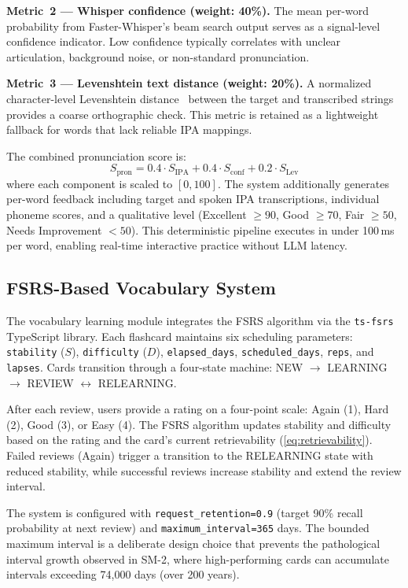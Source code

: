 \documentclass{IEEEtran}
\begin{document}
\textbf{Metric~2 --- Whisper confidence (weight: 40\%).} The mean per-word probability from Faster-Whisper's beam search output serves as a signal-level confidence indicator. Low confidence typically correlates with unclear articulation, background noise, or non-standard pronunciation.

\textbf{Metric~3 --- Levenshtein text distance (weight: 20\%).} A normalized character-level Levenshtein distance~\cite{levenshtein} between the target and transcribed strings provides a coarse orthographic check. This metric is retained as a lightweight fallback for words that lack reliable IPA mappings.

The combined pronunciation score is:
\begin{equation}
S_{\text{pron}} = 0.4 \cdot S_{\text{IPA}} + 0.4 \cdot S_{\text{conf}} + 0.2 \cdot S_{\text{Lev}}
\label{eq:pron_combined}
\end{equation}
where each component is scaled to $[0, 100]$. The system additionally generates per-word feedback including target and spoken IPA transcriptions, individual phoneme scores, and a qualitative level (Excellent $\geq 90$, Good $\geq 70$, Fair $\geq 50$, Needs Improvement $< 50$). This deterministic pipeline executes in under 100\,ms per word, enabling real-time interactive practice without LLM latency.

\subsection{FSRS-Based Vocabulary System}

The vocabulary learning module integrates the FSRS algorithm via the \texttt{ts-fsrs} TypeScript library. Each flashcard maintains six scheduling parameters: \texttt{stability} ($S$), \texttt{difficulty} ($D$), \texttt{elapsed\_days}, \texttt{scheduled\_days}, \texttt{reps}, and \texttt{lapses}. Cards transition through a four-state machine: NEW $\rightarrow$ LEARNING $\rightarrow$ REVIEW $\leftrightarrow$ RELEARNING.

After each review, users provide a rating on a four-point scale: Again (1), Hard (2), Good (3), or Easy (4). The FSRS algorithm updates stability and difficulty based on the rating and the card's current retrievability (\ref{eq:retrievability}). Failed reviews (Again) trigger a transition to the RELEARNING state with reduced stability, while successful reviews increase stability and extend the review interval.

The system is configured with \texttt{request\_retention=0.9} (target 90\% recall probability at next review) and \texttt{maximum\_interval=365} days. The bounded maximum interval is a deliberate design choice that prevents the pathological interval growth observed in SM-2, where high-performing cards can accumulate intervals exceeding 74{,}000 days (over 200 years).
\end{document}
